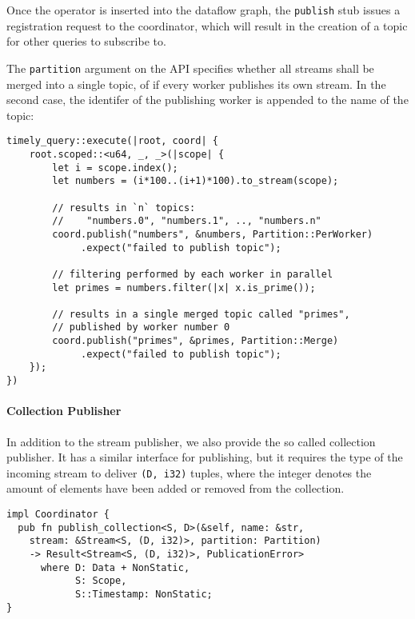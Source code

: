 Once the operator is inserted into the dataflow graph, the \lstinline{publish}
stub issues a registration request to the coordinator, which will result in the
creation of a topic for other queries to subscribe to.

The \lstinline{partition} argument on the API specifies whether all streams
shall be merged into a single topic, of if every worker publishes its own stream.
In the second case, the identifer of the publishing worker is appended to the
name of the topic:

\begin{lstlisting}[caption={
Example use of publisher.
}]
timely_query::execute(|root, coord| {
    root.scoped::<u64, _, _>(|scope| {
        let i = scope.index();
        let numbers = (i*100..(i+1)*100).to_stream(scope);

        // results in `n` topics:
        //    "numbers.0", "numbers.1", .., "numbers.n"
        coord.publish("numbers", &numbers, Partition::PerWorker)
             .expect("failed to publish topic");

        // filtering performed by each worker in parallel
        let primes = numbers.filter(|x| x.is_prime());

        // results in a single merged topic called "primes",
        // published by worker number 0
        coord.publish("primes", &primes, Partition::Merge)
             .expect("failed to publish topic");
    });
})
\end{lstlisting}


\paragraph{Collection Publisher}

In addition to the stream publisher, we also provide the so called collection
publisher. It has a similar interface for publishing, but it requires the
type of the incoming stream to deliver \lstinline{(D, i32)} tuples, where
the integer denotes the amount of elements have been added or removed from
the collection.

\begin{lstlisting}[caption={[Collection publisher interface]
}]
impl Coordinator {
  pub fn publish_collection<S, D>(&self, name: &str,
    stream: &Stream<S, (D, i32)>, partition: Partition)
    -> Result<Stream<S, (D, i32)>, PublicationError>
      where D: Data + NonStatic, 
            S: Scope,
            S::Timestamp: NonStatic;
}
\end{lstlisting}

